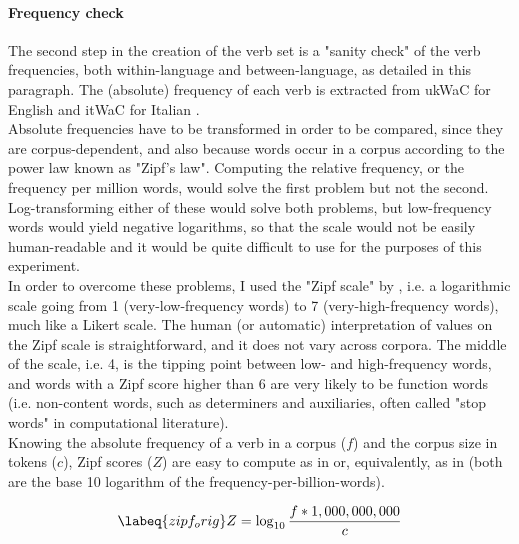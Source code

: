 \paragraph{Frequency check} The second step in the creation of the verb set is a "sanity check" of the verb frequencies, both within-language and between-language, as detailed in this paragraph. The (absolute) frequency of each verb is extracted from ukWaC for English and itWaC for Italian \parencite{baroni2009wacky}.\\
Absolute frequencies have to be transformed in order to be compared, since they are corpus-dependent, and also because words occur in a corpus according to the power law known as "Zipf's law".
Computing the relative frequency, or the frequency per million words, would solve the first problem but not the second. Log-transforming either of these would solve both problems, but low-frequency words would yield negative logarithms, so that the scale would not be easily human-readable and it would be quite difficult to use for the purposes of this experiment.\\
In order to overcome these problems, I used the "Zipf scale" by \textcite{van2014subtlex}, i.e. a logarithmic scale going from 1 (very-low-frequency words) to 7 (very-high-frequency words), much like a Likert scale. The human (or automatic) interpretation of values on the Zipf scale is straightforward, and it does not vary across corpora. The middle of the scale, i.e. 4, is the tipping point between low- and high-frequency words, and words with a Zipf score higher than 6 are very likely to be function words (i.e. non-content words, such as determiners and auxiliaries, often called "stop words" in computational literature).\\
Knowing the absolute frequency of a verb in a corpus ($f$) and the corpus size in tokens ($c$), Zipf scores ($Z$) are easy to compute as in  or, equivalently, as in  (both are the base 10 logarithm of the frequency-per-billion-words).

\begin{equation} \labeq{zipf_orig}
Z = \log _{10} \frac{f*1,000,000,000}{c}
\end{equation}

